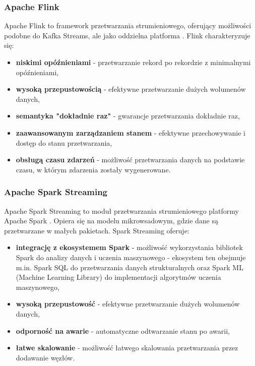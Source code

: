 \subsubsection{Apache Flink}
\label{subsubsec:apache_flink}

Apache Flink to framework przetwarzania strumieniowego, oferujący możliwości podobne do Kafka Streams,
ale jako oddzielna platforma \cite{flink}. Flink charakteryzuje się:

\begin{itemize}
    \item \textbf{niskimi opóźnieniami} - przetwarzanie rekord po rekordzie z minimalnymi opóźnieniami,
    \item \textbf{wysoką przepustowością} - efektywne przetwarzanie dużych wolumenów danych,
    \item \textbf{semantyka "dokładnie raz"} - gwarancje przetwarzania dokładnie raz,
    \item \textbf{zaawansowanym zarządzaniem stanem} - efektywne przechowywanie i dostęp do stanu przetwarzania,
    \item \textbf{obsługą czasu zdarzeń} - możliwość przetwarzania danych na podstawie czasu, w którym zdarzenia zostały wygenerowane.
\end{itemize}

\subsubsection{Apache Spark Streaming}
\label{subsubsec:spark_streaming}

Apache Spark Streaming to moduł przetwarzania strumieniowego platformy Apache Spark \cite{spark_streaming}.
Opiera się na modelu mikrowsadowym, gdzie dane są przetwarzane w małych pakietach. Spark Streaming oferuje:

\begin{itemize}
    \item \textbf{integrację z ekosystemem Spark} - możliwość wykorzystania bibliotek Spark do analizy danych i uczenia maszynowego - ekosystem ten obejmuje m.in. Spark SQL do przetwarzania danych strukturalnych oraz Spark ML (Machine Learning Library) do implementacji algorytmów uczenia maszynowego,
    \item \textbf{wysoką przepustowość} - efektywne przetwarzanie dużych wolumenów danych,
    \item \textbf{odporność na awarie} - automatyczne odtwarzanie stanu po awarii,
    \item \textbf{łatwe skalowanie} - możliwość łatwego skalowania przetwarzania przez dodawanie węzłów.
\end{itemize}

